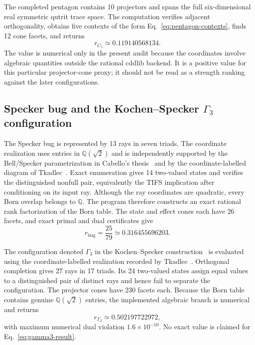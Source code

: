 \documentclass[aps,pra,twocolumn,superscriptaddress,nofootinbib]{revtex4-2}
\begin{document}
The completed pentagon contains 10 projectors and spans the full six-dimensional real symmetric qutrit trace space.  The computation verifies adjacent orthogonality, obtains five contexts of the form Eq.~\eqref{eq:pentagon-contexts}, finds 12 cone facets, and returns
\begin{equation}
        r_{C_5}\simeq0.119140568134.
        \label{eq:pentagon-result}
\end{equation}
The value is numerical only in the present audit because the coordinates
involve algebraic quantities outside the rational cddlib backend.  It is a
positive value for this particular projector-cone proxy; it should not be read
as a strength ranking against the later configurations.

\subsection{Specker bug and the Kochen--Specker \texorpdfstring{$\Gamma_3$}{Gamma3} configuration}

The Specker bug is represented by 13 rays in seven triads.  The coordinate
realization uses entries in $\mathbb Q(\sqrt2)$ and is independently supported
by the Bell/Specker parametrization in Cabello's thesis~\cite{Cabello-1996-diss}
and by the coordinate-labelled diagram of Tkadlec~\cite{tkadlec-96}.  Exact
enumeration gives 14 two-valued states and verifies the distinguished nonfull
pair, equivalently the TIFS implication after conditioning on its input ray.
Although the ray coordinates are quadratic, every Born overlap belongs to
$\mathbb Q$.  The program therefore constructs an exact rational rank
factorization of the Born table.  The state and effect cones each have 26
facets, and exact primal and dual certificates give
\begin{equation}
        r_{\mathrm{bug}}=\frac{25}{79}\simeq0.316455696203.
        \label{eq:specker-bug-result}
\end{equation}

The configuration denoted $\Gamma_3$ in the Kochen--Specker construction~\cite{kochen1}
is evaluated using the coordinate-labelled realization recorded by
Tkadlec~\cite{tkadlec-96}.  Orthogonal completion gives 27 rays in 17 triads.
Its 24 two-valued states assign equal values to a distinguished pair of
distinct rays and hence fail to separate the configuration.  The projector
cones have 230 facets each.  Because the Born table contains genuine
$\mathbb Q(\sqrt2)$ entries, the implemented algebraic branch is numerical and
returns
\begin{equation}
        r_{\Gamma_3}\simeq0.502197722972,
        \label{eq:gamma3-result}
\end{equation}
with maximum numerical dual violation $1.6\times10^{-10}$.  No exact value is
claimed for Eq.~\eqref{eq:gamma3-result}.
\end{document}
